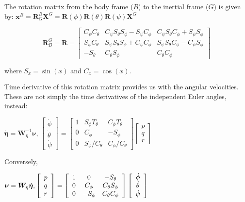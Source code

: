The rotation matrix from the body frame ($B$) to the inertial frame ($G$) is given by:
$\mathbf{x}^{B}=\mathbf{R}_{G}^{B} \mathbf{X}^{G}=\mathbf{R}(\phi) \mathbf{R}(\theta) \mathbf{R}(\psi) \mathbf{X}^{G}$

$$\boldsymbol{R}_B^G=\boldsymbol{R}=\left[ \begin{array}{ccc}{C_{\psi} C_{\theta}} & {C_{\psi} S_{\theta} S_{\phi}-S_{\psi} C_{\phi}} & {C_{\psi} S_{\theta} C_{\phi}+S_{\psi} S_{\phi}} \\ {S_{\psi} C_{\theta}} & {S_{\psi} S_{\theta} S_{\phi}+C_{\psi} C_{\phi}} & {S_{\psi} S_{\theta} C_{\phi}-C_{\psi} S_{\phi}} \\ {-S_{\theta}} & {C_{\theta} S_{\phi}} & {C_{\theta} C_{\phi}}\end{array}\right]$$

where $S_{x}=\sin (x)$ and $C_{x}=\cos (x)$.

Time derivative of this rotation matrix provides us with the angular velocities. These are not simply the time derivatives of the independent Euler angles, instead:

$\dot{\boldsymbol{\eta}}=\boldsymbol{W}_{\eta}^{-1} \boldsymbol{\nu}$, \hfill $\left[ \begin{array}{c}{\dot{\phi}} \\ {\dot{\theta}} \\ {\dot{\psi}}\end{array}\right]=\left[ \begin{array}{ccc}{1} & {S_{\phi} T_{\theta}} & {C_{\phi} T_{\theta}} \\ {0} & {C_{\phi}} & {-S_{\phi}} \\ {0} & {S_{\phi} / C_{\theta}} & {C_{\phi} / C_{\theta}}\end{array}\right] \left[ \begin{array}{l}{p} \\ {q} \\ {r}\end{array}\right]$

Conversely,

$\boldsymbol{\nu}=\boldsymbol{W}_{\eta} \dot{\boldsymbol{\eta}}, \hfill \left[ \begin{array}{l}{p} \\ {q} \\ {r}\end{array}\right]=\left[ \begin{array}{ccc}{1} & {0} & {-S_{\theta}} \\ {0} & {C_{\phi}} & {C_{\theta} S_{\phi}} \\ {0} & {-S_{\phi}} & {C_{\theta} C_{\phi}}\end{array}\right] \left[ \begin{array}{c}{\dot{\phi}} \\ {\dot{\theta}} \\ {\dot{\psi}}\end{array}\right]$
  
